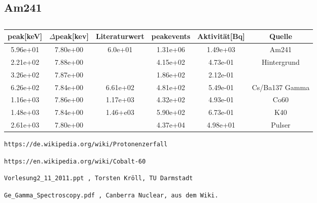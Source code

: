 \documentclass[]{article}
\begin{document}
\subsection{Am241}
\begin{table}[H]
	\centering
\begin{tabular}{|c|c|c|c|c|c|}
	\hline
	peak[keV]&$\Delta$peak[kev]&Literaturwert&peakevents&Aktivität[Bq]&Quelle \\ \hline\hline
		5.96e+01 & 7.80e+00 &6.0e+01& 1.31e+06 & 1.49e+03 &Am241\\ \hline
		2.21e+02 & 7.88e+00 && 4.15e+02 & 4.73e-01 & Hintergrund\\ \hline
		3.26e+02 & 7.87e+00 && 1.86e+02 & 2.12e-01 & \\ \hline
		6.26e+02 & 7.84e+00 &6.61e+02& 4.81e+02 & 5.49e-01 &Cs/Ba137 Gamma\\ \hline
		1.16e+03 & 7.86e+00& 1.17e+03& 4.32e+02 & 4.93e-01 &Co60\\ \hline
		1.48e+03 & 7.84e+00 &1.46+e03& 5.90e+02 & 6.73e-01 &K40\\ \hline
		2.61e+03 & 7.80e+00 && 4.37e+04 & 4.98e+01 &Pulser\\ \hline
		\hline
	\end{tabular}
	\caption{\label{}}
\end{table}
\newpage
\begin{thebibliography}{}

 \begin{verbatim}
https://de.wikipedia.org/wiki/Protonenzerfall
\end{verbatim}

 \begin{verbatim}
https://en.wikipedia.org/wiki/Cobalt-60
\end{verbatim}

\begin{verbatim}
Vorlesung2_11_2011.ppt , Torsten Kröll, TU Darmstadt
\end{verbatim}  

\begin{verbatim}
Ge_Gamma_Spectroscopy.pdf , Canberra Nuclear, aus dem Wiki.
\end{verbatim}  

\end{thebibliography}
\end{document}
